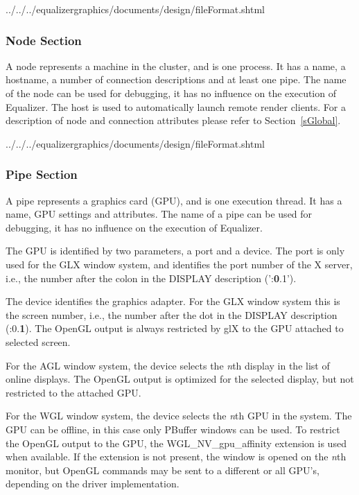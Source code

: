 \documentclass[10pt,a4]{scrartcl}
\newcommand{\sref}[1]{Section~\ref{#1}}
\begin{document}
{\footnotesize
  {../../../equalizergraphics/documents/design/fileFormat.shtml}}

\subsubsection{Node Section}

A node represents a machine in the cluster, and is one process. It has a name, a
hostname, a number of connection descriptions and at least one pipe. The name of
the node can be used for debugging, it has no influence on the execution of
Equalizer. The host is used to automatically launch remote render clients. For a
description of node and connection attributes please refer to \sref{sGlobal}.

{\footnotesize
  {../../../equalizergraphics/documents/design/fileFormat.shtml}}

\subsubsection{Pipe Section}

A pipe represents a graphics card (GPU), and is one execution thread. It
has a name, GPU settings and attributes. The name of a pipe can be used
for debugging, it has no influence on the execution of Equalizer.

The GPU is identified by two parameters, a port and a device. The port
is only used for the GLX window system, and identifies the port number
of the X server, i.e., the number after the colon in the DISPLAY
description (':\textbf{0}.1').

The device identifies the graphics adapter. For the GLX window system
this is the screen number, i.e., the number after the dot in the DISPLAY
description (:0.\textbf{1}). The OpenGL output is always restricted by
glX to the GPU attached to selected screen.

For the AGL window system, the device selects the \textit{n}th display
in the list of online displays. The OpenGL output is optimized for the
selected display, but not restricted to the attached GPU.

For the WGL window system, the device selects the \textit{n}th GPU in the
system. The GPU can be offline, in this case only PBuffer windows can be
used. To restrict the OpenGL output to the GPU, the
\textsf{WGL\_NV\_gpu\_affinity} extension is used when available. If the
extension is not present, the window is opened on the \textit{n}th monitor, but
OpenGL commands may be sent to a different or all GPU's, depending on the driver
implementation.
\end{document}
